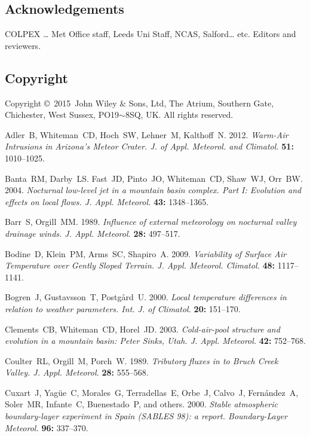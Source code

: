 \documentclass[times]{qjrms4}
\def\volumeyear{2015}
\begin{document}
\subsection{Acknowledgements}
COLPEX … Met Office staff, Leeds Uni Staff, NCAS, Salford… etc.  Editors and reviewers.

\subsection{Copyright}
Copyright \copyright\ \volumeyear\ John Wiley \& Sons, Ltd, The Atrium,
Southern Gate, Chichester, West Sussex, PO19$\sim$8SQ, UK.  All rights reserved.

\begin{thebibliography}{99}

Adler~B, Whiteman~CD, Hoch~SW, Lehner~M, Kalthoff~N. 2012.
\emph{Warm-Air Intrusions in Arizona's Meteor Crater. J. of Appl. Meteorol. and Climatol.}
{\bf 51:} 1010--1025.

Banta~RM, Darby~LS. Fast~JD, Pinto~JO, Whiteman~CD, Shaw~WJ, Orr~BW. 2004.
\emph{Nocturnal low-level jet in a mountain basin complex. Part I: Evolution and effects on local flows. J. Appl. Meteorol.} {\bf 43:} 1348--1365.

Barr~S, Orgill~MM. 1989. \emph{Influence of external meteorology on nocturnal valley drainage winds. J. Appl. Meteorol.} {\bf 28:} 497--517.

Bodine~D, Klein~PM, Arms~SC, Shapiro~A. 2009. \emph{Variability of Surface Air Temperature over Gently Sloped Terrain. J. Appl. Meteorol. Climatol.} {\bf 48:} 1117--1141.

Bogren~J, Gustavsson~T, Postg{\aa}rd~U. 2000. \emph{Local temperature differences in relation to weather parameters. Int. J. of Climatol.} {\bf 20:} 151--170.

Clements~CB, Whiteman~CD, Horel~JD. 2003. \emph{Cold-air-pool structure and evolution in a mountain basin: Peter Sinks, Utah. J. Appl. Meteorol.} {\bf 42:} 752--768.

Coulter~RL, Orgill~M, Porch~W. 1989. \emph{Tributory fluxes in to Bruch Creek Valley. J. Appl. Meteorol.} {\bf 28:} 555--568.

Cuxart~J, Yag{\"u}e~C, Morales~G, Terradellas~E, Orbe~J, Calvo~J, Fern{\'a}ndez~A, Soler~MR, Infante~C, Buenestado~P, and others. 2000. \emph{Stable atmospheric boundary-layer experiment in Spain (SABLES 98): a report. Boundary-Layer Meteorol.} {\bf 96:} 337--370.


\end{thebibliography}
\end{document}
